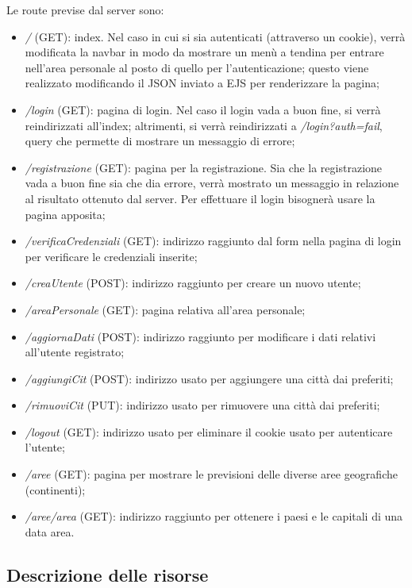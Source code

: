 Le route previse dal server sono:
\begin{itemize}
    \item \emph{/} (GET): index. Nel caso in cui si sia autenticati (attraverso un cookie), verrà modificata la
          navbar in modo da mostrare un menù a tendina per entrare nell'area personale al posto di quello per l'autenticazione;
          questo viene realizzato modificando il JSON inviato a EJS per renderizzare la pagina;
    \item \emph{/login} (GET): pagina di login. Nel caso il login vada a buon fine, si verrà reindirizzati all'index; altrimenti,
          si verrà reindirizzati a \emph{/login?auth=fail}, query che permette di mostrare un messaggio di errore;
    \item \emph{/registrazione} (GET): pagina per la registrazione. Sia che la registrazione vada a buon fine sia che dia errore,
          verrà mostrato un messaggio in relazione al risultato ottenuto dal server. Per effettuare il login bisognerà usare la pagina
          apposita;
    \item \emph{/verificaCredenziali} (GET): indirizzo raggiunto dal form nella pagina di login per verificare le credenziali
          inserite;
    \item \emph{/creaUtente} (POST): indirizzo raggiunto per creare un nuovo utente;
    \item \emph{/areaPersonale} (GET): pagina relativa all'area personale;
    \item \emph{/aggiornaDati} (POST): indirizzo raggiunto per modificare i dati relativi all'utente registrato;
    \item \emph{/aggiungiCit} (POST): indirizzo usato per aggiungere una città dai preferiti;
    \item \emph{/rimuoviCit} (PUT): indirizzo usato per rimuovere una città dai preferiti;
    \item \emph{/logout} (GET): indirizzo usato per eliminare il cookie usato per autenticare l'utente;
    \item \emph{/aree} (GET): pagina per mostrare le previsioni delle diverse aree geografiche (continenti);
    \item \emph{/aree/area} (GET): indirizzo raggiunto per ottenere i paesi e le capitali di una data area.
\end{itemize}

\subsection{Descrizione delle risorse}

